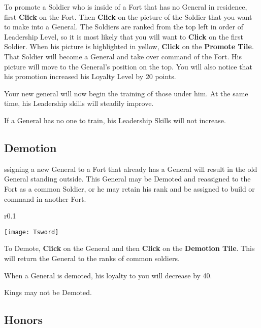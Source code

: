 To promote a Soldier who is inside of a Fort that has no General in residence, first \textbf{Click} on the Fort. Then \textbf{Click} on the picture of the Soldier that you want to make into a General. The Soldiers are ranked from the top left in order of Leadership Level, so it is most likely that you will want to \textbf{Click} on the first Soldier. When his picture is highlighted in yellow, \textbf{Click} on the \textbf{Promote Tile}. That Soldier will become a General and take over command of the Fort. His picture will move to the General’s position on the top. You will also notice that his promotion increased his Loyalty Level by 20 points.

Your new general will now begin the training of those under him. At the same time, his Leadership skills will steadily improve.

If a General has no one to train, his Leadership Skills will not increase.

\subsection{\textsf{Demotion}}


ssigning a new General to a Fort that already has a General will result in the old General standing outside. This General may be Demoted and reassigned to the Fort as a common Soldier, or he may retain his rank and be assigned to build or command in another Fort.

\begin{wrapfigure}{r}{0.1\textwidth}
    \vspace{-20pt}
    \begin{center}
        \texttt{[image: Tsword]}
    \end{center}
    \vspace{-20pt}
\end{wrapfigure}

To Demote, \textbf{Click} on the General and then \textbf{Click} on the \textbf{Demotion Tile}. This will return the General to the ranks of common soldiers.

When a General is demoted, his loyalty to you will decrease by 40.

Kings may not be Demoted.

\subsection{\textsf{Honors}}

